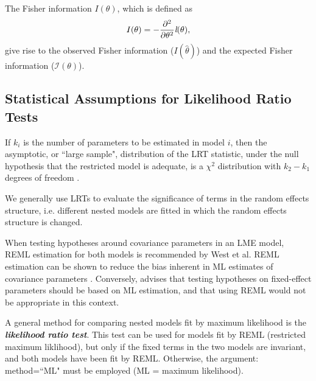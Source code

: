 \documentclass[12pt, a4paper]{report}
\theoremstyle{plain}
\theoremstyle{definition}
\theoremstyle{remark}
\begin{document}
	
	The Fisher information $I(\theta)$, which is defined as
	\[
	I(\theta) = - \frac{\partial^2}{\partial \theta^2}\emph{l}(\theta),
	\]
	give rise to the observed Fisher information ($I(\hat{\theta})$) and the expected Fisher information ($\mathcal{I}(\theta)$).
	
	
	
	
	
	
	
	
	
	
	
	
	
	
	
	\subsection{Statistical Assumptions for Likelihood Ratio Tests}
	
	
	If $k_i$ is the number of parameters to be estimated in model $i$, then the asymptotic, or ``large sample", distribution of the LRT statistic, under the null hypothesis that the restricted model is adequate, is a $\chi^2$ distribution with $k_2-k_1$ degrees of freedom \citep[pg.83]{pb}.
	
	
	We generally use LRTs to evaluate the significance of terms in the random effects structure, i.e. different nested models are fitted in which the random effects structure is changed.
	
	
	When testing hypotheses around covariance parameters in an LME model, REML estimation for both models is recommended by West et al. REML estimation can be shown to reduce the bias inherent in ML estimates of covariance parameters \citep{west}. Conversely, \citet{pb} advises that testing hypotheses on fixed-effect parameters should be based on ML estimation, and that using REML would not be appropriate in this context.
	
	
	
	
	
	
	
	A general method for comparing nested models fit by maximum likelihood is the \textbf{\emph{likelihood ratio test}}. This test can be used for models fit by REML (restricted maximum liklihood), but only if the fixed terms in the two models are invariant, and both models have been fit by REML. Otherwise, the argument: method=``ML" must be employed (ML = maximum likelihood).
	
\end{document}
